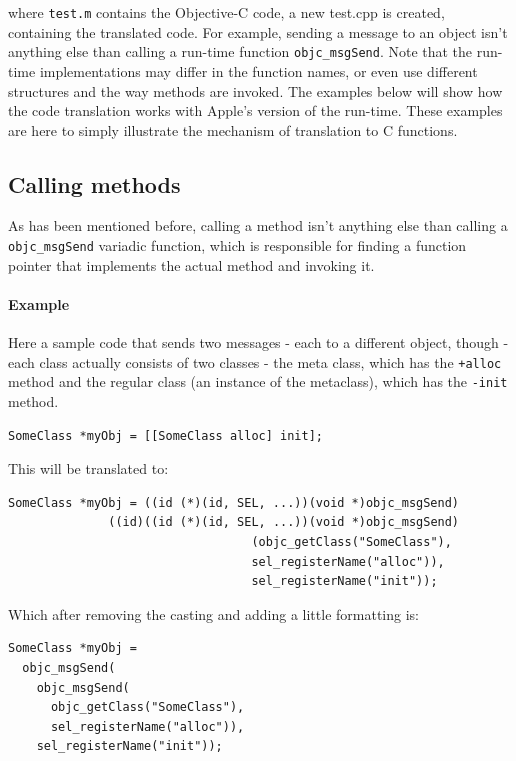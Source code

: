 where \verb=test.m= contains the Objective-C code, a new test.cpp is created, containing the translated code. For example, sending a message to an object isn't anything else than calling a run-time function \verb=objc_msgSend=. Note that the run-time implementations may differ in the function names, or even use different structures and the way methods are invoked. The examples below will show how the code translation works with Apple's version of the run-time. These examples are here to simply illustrate the mechanism of translation to C functions.

\subsection{Calling methods}

As has been mentioned before, calling a method isn't anything else than calling a \verb=objc_msgSend= variadic function, which is responsible for finding a function pointer that implements the actual method and invoking it.

\paragraph{Example}
Here a sample code that sends two messages - each to a different object, though - each class actually consists of two classes - the meta class, which has the \verb=+alloc= method and the regular class (an instance of the metaclass), which has the \verb=-init= method.

\begin{verbatim}SomeClass *myObj = [[SomeClass alloc] init];\end{verbatim}

This will be translated to:
\begin{verbatim}SomeClass *myObj = ((id (*)(id, SEL, ...))(void *)objc_msgSend)
              ((id)((id (*)(id, SEL, ...))(void *)objc_msgSend)
                                  (objc_getClass("SomeClass"),
                                  sel_registerName("alloc")), 
                                  sel_registerName("init"));
\end{verbatim}

Which after removing the casting and adding a little formatting is:

\begin{verbatim}SomeClass *myObj = 
  objc_msgSend(
    objc_msgSend(
      objc_getClass("SomeClass"),  
      sel_registerName("alloc")), 
    sel_registerName("init"));
\end{verbatim}

